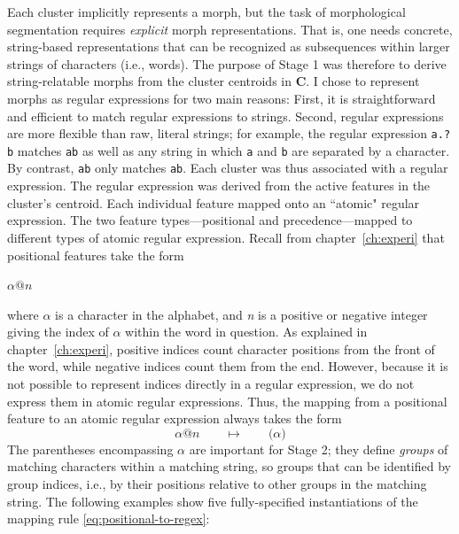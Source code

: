 {Each cluster implicitly represents a morph, but the task of morphological 
segmentation requires \emph{explicit} morph representations. 
 That is, one needs concrete, string-based representations that can be recognized 
 as subsequences within larger strings of characters (i.e., words). 
The purpose of Stage 1 was therefore to derive string-relatable morphs from the cluster centroids in $\mathbf{C}$.
I chose to represent morphs as regular expressions for two main reasons: First, it is straightforward and efficient to match regular expressions to strings. Second, regular expressions are more flexible than raw, literal strings; for example, the regular expression 
\texttt{a.?b} matches \texttt{ab} as well as any string in which
\texttt{a} and \texttt{b} are separated by a character. By contrast, \texttt{ab} only matches \texttt{ab}.  
Each cluster was thus associated with a regular expression. The regular expression was derived from the active 
features in the cluster's centroid. Each individual feature mapped onto an ``atomic" regular expression.
The two feature types---positional and precedence---mapped to different types of
atomic regular expression. 
Recall from chapter~\ref{ch:experi} that positional features take 
the form
\begin{centering}
$\alpha\text{@}n$
\end{centering}
where $\alpha$ is a character in the alphabet, and \textit{n} is a positive or negative integer 
giving the index of $\alpha$ within the word in question. As explained in chapter~\ref{ch:experi}, 
positive indices count character positions from the front of the word, while negative indices 
count them from the end. However, because it is not possible to represent indices directly in a regular
expression, we do not express them in atomic regular 
expressions. %
Thus, the mapping from a positional feature to an atomic regular expression always takes the form 
\begin{equation} \label{eq:positional-to-regex}
\alpha\text{@}n \qquad \mapsto \qquad \texttt{(}\alpha\texttt{)}
\end{equation}
The parentheses encompassing $\alpha$ are important for Stage 2; they define 
\emph{groups} of matching characters within a matching
string, so groups that can be identified by group indices, i.e., by their positions relative to other groups
in the matching string.
The following examples show five fully-specified instantiations of the mapping rule \eqref{eq:positional-to-regex}:
\begin{exe}

\end{exe}}
